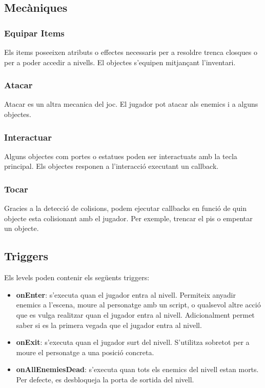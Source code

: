 \documentclass[a4paper,12pt]{article}
\begin{document}
\subsection{Mecàniques}
\subsubsection{Equipar Items}
Els items poseeixen atributs o effectes necessaris per a resoldre trenca closques o per a poder accedir a nivells. El objectes s'equipen mitjançant l'inventari.
\subsubsection{Atacar}
Atacar es un altra mecanica del joc. El jugador pot atacar als enemics i a alguns objectes.  
\subsubsection{Interactuar}
Alguns objectes com portes o estatues poden ser interactuats amb la tecla principal. Els objectes responen a l'interacció executant un callback. 
\subsubsection{Tocar}
Gracies a la detecció de colisions, podem ejecutar callbacks en funció de quin objecte esta colisionant amb el jugador. Per exemple, trencar el pis o empentar un objecte.

\subsection{Triggers}
Els levels poden contenir els següents triggers: 
\begin{itemize}
    \item \textbf{onEnter}: s'executa quan el jugador entra al nivell. Permiteix anyadir enemics a l'escena, moure al personatge amb un script, o qualsevol altre acció que es vulga realitzar quan el jugador entra al nivell. Adicionalment permet saber si es la primera vegada que el jugador entra al nivell. 
    \item \textbf{onExit}: s'executa quan el jugador surt del nivell. S'utilitza sobretot per a moure el personatge a una posició concreta.
    \item \textbf{onAllEnemiesDead}: s'executa quan tots els enemics del nivell estan morts. Per defecte, es desbloqueja la porta de sortida del nivell.
\end{itemize}
\end{document}
